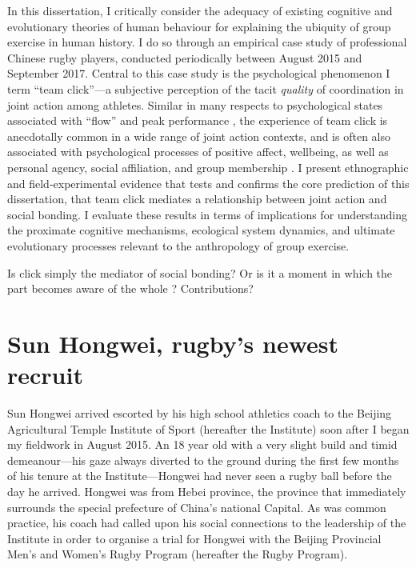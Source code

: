 In this dissertation, I critically consider the adequacy of existing cognitive and evolutionary theories of human behaviour for explaining the ubiquity of group exercise in human history.  I do so through an empirical case study of professional Chinese rugby players, conducted periodically between August 2015 and September 2017. Central to this case study is the psychological phenomenon I term ``team click''---a subjective perception  of the tacit \textit{quality} of coordination in joint action among athletes. Similar in many respects to psychological states associated with ``flow'' and peak performance \citep{Csikszentmihalyi1992}, the experience of team click is anecdotally common in a wide range of joint action contexts, and is often also associated with psychological processes of positive affect, wellbeing, as well as personal agency, social affiliation, and group membership \citep{Marsh2009, Wheatley2012}.  I present ethnographic and field-experimental evidence that tests and confirms the core prediction of this dissertation, that team click mediates a relationship between joint action and social bonding. I evaluate these results in terms of implications for understanding the proximate cognitive mechanisms, ecological system dynamics, and ultimate evolutionary processes relevant to the anthropology of group exercise.

Is click simply the mediator of social bonding?
Or is it a moment in which the part becomes aware of the whole ?
\citep{}
Contributions?


\section{Sun Hongwei, rugby's newest recruit}

Sun Hongwei arrived escorted by his high school athletics coach to the Beijing Agricultural Temple Institute of Sport (hereafter the Institute) soon after I began my fieldwork in August 2015.  An 18 year old with a very slight build and timid demeanour---his gaze always diverted to the ground during the first few months of his tenure at the Institute---Hongwei had never seen a rugby ball before the day he arrived.
Hongwei was from Hebei province, the province that immediately surrounds the special prefecture of China's national Capital.  As was common practice, his coach had called upon his social connections to the leadership of the Institute in order to organise a trial for Hongwei with the Beijing Provincial Men’s and Women's Rugby Program (hereafter the Rugby Program).

